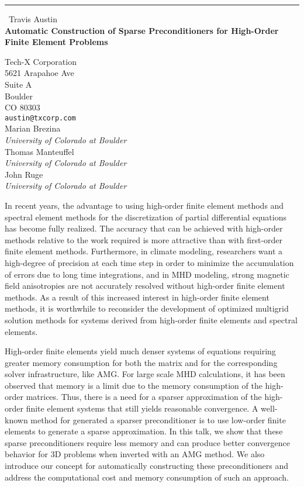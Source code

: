 \documentclass{report}
\begin{document}
\begin{center}
\rule{6in}{1pt} \
{\large Travis Austin \\
{\bf Automatic Construction of Sparse Preconditioners for High-Order Finite Element Problems}}

Tech-X Corporation \\ 5621 Arapahoe Ave \\ Suite A \\ Boulder \\ CO 80303
\\
{\tt austin@txcorp.com}\\
Marian Brezina\\
{\em University of Colorado at Boulder}\\
Thomas Manteuffel\\
{\em University of Colorado at Boulder}\\
John Ruge\\
{\em University of Colorado at Boulder}\end{center}

In recent years, the advantage to using high-order finite element methods
and spectral element methods for the discretization of partial
differential equations has become fully realized. The accuracy that can
be achieved with high-order methods relative to the work required is more
attractive than with first-order finite element methods. Furthermore, in
climate modeling, researchers want a high-degree of precision at each
time step in order to minimize the accumulation of errors due to long
time integrations, and in MHD modeling, strong magnetic field
anisotropies are not accurately resolved without high-order finite
element methods. As a result of this increased interest in high-order
finite element methods, it is worthwhile to reconsider the development of
optimized multigrid solution methods for systems derived from high-order
finite elements and spectral elements.

High-order finite elements yield much denser systems of equations
requiring greater memory consumption for both the matrix and for the
corresponding solver infrastructure, like AMG. For large scale MHD
calculations, it has been observed that memory is a limit due to the
memory consumption of the high-order matrices. Thus, there is a need for
a sparser approximation of the high-order finite element systems that
still yields reasonable convergence. A well-known method for generated a
sparser preconditioner is to use low-order finite elements to generate a
sparse approximation. In this talk, we show that these sparse
preconditioners require less memory and can produce better convergence
behavior for 3D problems when inverted with an AMG method. We also
introduce our concept for automatically constructing these
preconditioners and address the computational cost and memory consumption
of such an approach.
\end{document}
